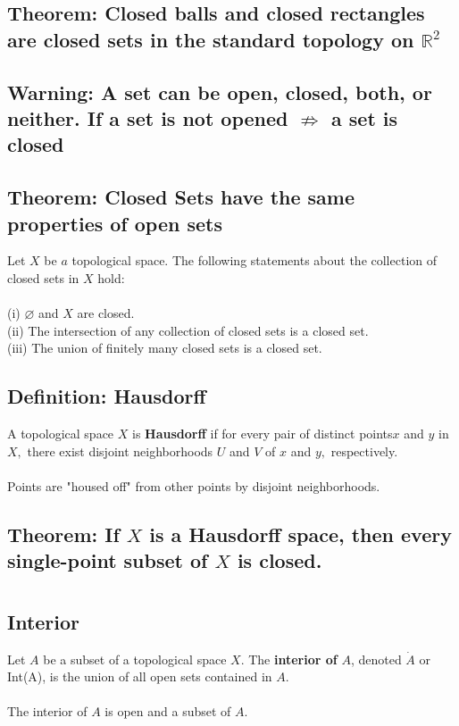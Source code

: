 \documentclass[12pt]{article}
\newcommand{\R}{\mathds{R}}
\begin{document}
	\subsection{Theorem: Closed balls and closed rectangles are closed sets in the standard topology on $ \R^2 $ }
	\subsection{Warning: A set can be open, closed, both, or neither. If a set is not opened $ \not \Rightarrow$ a set is closed }
	\subsection{Theorem: Closed Sets have the same properties of open sets}
		Let $X$ be $a$ topological space. The following statements about the collection of closed sets in $X$ hold:\\
		\\
		(i) $\varnothing$ and $X$ are closed.\\
		(ii) The intersection of any collection of closed sets is a closed set.\\
		(iii) The union of finitely many closed sets is a closed set.\\
	\subsection{Definition: Hausdorff}
		A topological space $X$ is \textbf{Hausdorff} if for every pair of distinct points$x$ and $y$ in $X ,$ there exist disjoint neighborhoods $U$ and $V$ of $x$
		and $y ,$ respectively. \\
		\\
		Points are "housed off" from other points by disjoint neighborhoods.
	\subsection{Theorem: If $X$ is a Hausdorff space, then every single-point subset of $X$ is closed.}

\section{}

	\subsection{Interior}
	Let $ A $ be a subset of a topological space $X .$ The\textbf{ interior of }$ A $, denoted $\dot { A }$ or Int(A), is the union of all open sets contained in $A$.\\
	\\
	The interior of $ A $ is open and a subset of $ A $. 
\end{document}
